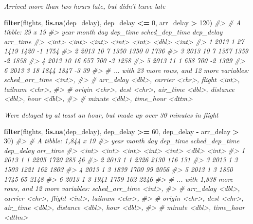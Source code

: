 \documentclass[]{book}
\newenvironment{Shaded}{\begin{snugshade}}{\end{snugshade}}
\newcommand{\CommentTok}[1]{\textcolor[rgb]{0.56,0.35,0.01}{\textit{#1}}}
\newcommand{\DecValTok}[1]{\textcolor[rgb]{0.00,0.00,0.81}{#1}}
\newcommand{\KeywordTok}[1]{\textcolor[rgb]{0.13,0.29,0.53}{\textbf{#1}}}
\newcommand{\NormalTok}[1]{#1}
\newcommand{\OperatorTok}[1]{\textcolor[rgb]{0.81,0.36,0.00}{\textbf{#1}}}
\newcommand{\StringTok}[1]{\textcolor[rgb]{0.31,0.60,0.02}{#1}}
\theoremstyle{plain}
\theoremstyle{remark}
\theoremstyle{definition}
\theoremstyle{definition}
\theoremstyle{definition}
\theoremstyle{remark}
\begin{document}
\emph{Arrived more than two hours late, but didn't leave late}

\begin{Shaded}
\begin{Highlighting}[]
\KeywordTok{filter}\NormalTok{(flights, }\OperatorTok{!}\KeywordTok{is.na}\NormalTok{(dep_delay), dep_delay }\OperatorTok{<=}\StringTok{ }\DecValTok{0}\NormalTok{, arr_delay }\OperatorTok{>}\StringTok{ }\DecValTok{120}\NormalTok{)}
\CommentTok{#> # A tibble: 29 x 19}
\CommentTok{#>    year month   day dep_time sched_dep_time dep_delay arr_time}
\CommentTok{#>   <int> <int> <int>    <int>          <int>     <dbl>    <int>}
\CommentTok{#> 1  2013     1    27     1419           1420        -1     1754}
\CommentTok{#> 2  2013    10     7     1350           1350         0     1736}
\CommentTok{#> 3  2013    10     7     1357           1359        -2     1858}
\CommentTok{#> 4  2013    10    16      657            700        -3     1258}
\CommentTok{#> 5  2013    11     1      658            700        -2     1329}
\CommentTok{#> 6  2013     3    18     1844           1847        -3       39}
\CommentTok{#> # ... with 23 more rows, and 12 more variables: sched_arr_time <int>,}
\CommentTok{#> #   arr_delay <dbl>, carrier <chr>, flight <int>, tailnum <chr>,}
\CommentTok{#> #   origin <chr>, dest <chr>, air_time <dbl>, distance <dbl>, hour <dbl>,}
\CommentTok{#> #   minute <dbl>, time_hour <dttm>}
\end{Highlighting}
\end{Shaded}

\emph{Were delayed by at least an hour, but made up over 30 minutes in
flight}

\begin{Shaded}
\begin{Highlighting}[]
\KeywordTok{filter}\NormalTok{(flights, }\OperatorTok{!}\KeywordTok{is.na}\NormalTok{(dep_delay),}
\NormalTok{       dep_delay }\OperatorTok{>=}\StringTok{ }\DecValTok{60}\NormalTok{, dep_delay }\OperatorTok{-}\StringTok{ }\NormalTok{arr_delay }\OperatorTok{>}\StringTok{ }\DecValTok{30}\NormalTok{)}
\CommentTok{#> # A tibble: 1,844 x 19}
\CommentTok{#>    year month   day dep_time sched_dep_time dep_delay arr_time}
\CommentTok{#>   <int> <int> <int>    <int>          <int>     <dbl>    <int>}
\CommentTok{#> 1  2013     1     1     2205           1720       285       46}
\CommentTok{#> 2  2013     1     1     2326           2130       116      131}
\CommentTok{#> 3  2013     1     3     1503           1221       162     1803}
\CommentTok{#> 4  2013     1     3     1839           1700        99     2056}
\CommentTok{#> 5  2013     1     3     1850           1745        65     2148}
\CommentTok{#> 6  2013     1     3     1941           1759       102     2246}
\CommentTok{#> # ... with 1,838 more rows, and 12 more variables: sched_arr_time <int>,}
\CommentTok{#> #   arr_delay <dbl>, carrier <chr>, flight <int>, tailnum <chr>,}
\CommentTok{#> #   origin <chr>, dest <chr>, air_time <dbl>, distance <dbl>, hour <dbl>,}
\CommentTok{#> #   minute <dbl>, time_hour <dttm>}
\end{Highlighting}
\end{Shaded}
\end{document}
